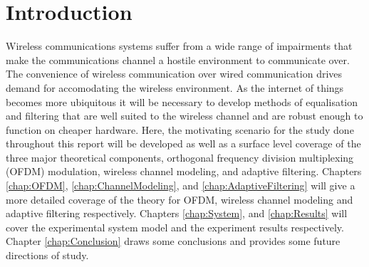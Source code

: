 \chapter{Introduction}
\label{ch:Introduction}
Wireless communications systems suffer from a wide %
range of impairments that make the communications %
channel a hostile environment to communicate over. %
The convenience of wireless communication over %
wired communication drives demand for accomodating %
the wireless environment. %
As the internet of things becomes more ubiquitous %
it will be necessary to develop methods of %
equalisation and filtering that are well suited to the %
wireless channel and are robust enough to function %
on cheaper hardware. Here, the motivating %
scenario for the study done throughout this %
report will be developed as well as a surface level %
coverage of the three major theoretical components, %
orthogonal frequency division multiplexing (OFDM) %
modulation, wireless channel modeling, and %
adaptive filtering. Chapters \ref{chap:OFDM}, %
\ref{chap:ChannelModeling}, and %
\ref{chap:AdaptiveFiltering} will give a more detailed %
coverage of the theory for OFDM, wireless channel %
modeling and adaptive filtering respectively. Chapters %
\ref{chap:System}, and \ref{chap:Results} will cover %
the experimental system model and the experiment %
results respectively. Chapter \ref{chap:Conclusion} %
draws some conclusions and provides some future %
directions of study.

